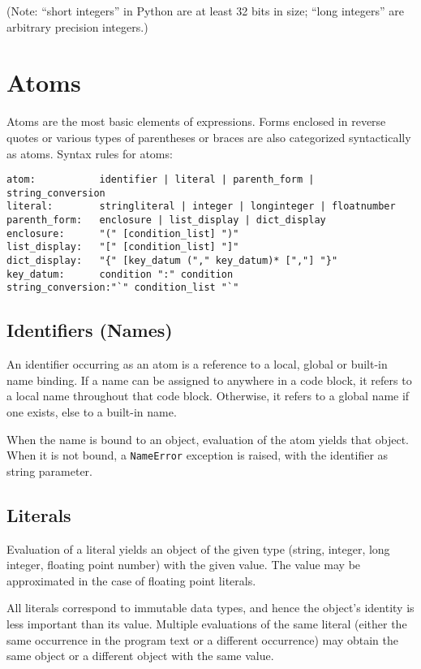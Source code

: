 (Note: ``short integers'' in Python are at least 32 bits in size;
``long integers'' are arbitrary precision integers.)

\section{Atoms}

Atoms are the most basic elements of expressions.
Forms enclosed in reverse quotes or various types of parentheses
or braces are also categorized syntactically as atoms.
Syntax rules for atoms:

\begin{verbatim}
atom:           identifier | literal | parenth_form | string_conversion
literal:        stringliteral | integer | longinteger | floatnumber
parenth_form:   enclosure | list_display | dict_display
enclosure:      "(" [condition_list] ")"
list_display:   "[" [condition_list] "]"
dict_display:   "{" [key_datum ("," key_datum)* [","] "}"
key_datum:      condition ":" condition
string_conversion:"`" condition_list "`"
\end{verbatim}

\subsection{Identifiers (Names)}

An identifier occurring as an atom is a reference to a local, global
or built-in name binding.  If a name can be assigned to anywhere in a code
block, it refers to a local name throughout that code block.
Otherwise, it refers to a global name if one exists, else to a
built-in name.

When the name is bound to an object, evaluation of the atom
yields that object.
When it is not bound, a {\tt NameError} exception
is raised, with the identifier as string parameter.

\subsection{Literals}

Evaluation of a literal yields an object of the given type
(string, integer, long integer, floating point number)
with the given value.
The value may be approximated in the case of floating point literals.

All literals correspond to immutable data types, and hence the object's
identity is less important than its value.
Multiple evaluations of the same literal (either the same occurrence
in the program text or a different occurrence) may
obtain the same object or a different object with the same value.

